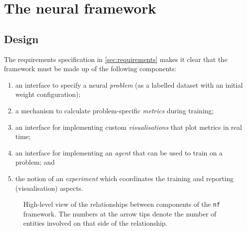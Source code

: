 \chapter{The neural framework}
\label{chap:framework}

\section{Design}
The requirements specification in \ref{sec:requirements} makes it clear that the framework must be made up of the following components:
\begin{enumerate}
    \item an interface to specify a neural \textit{problem} (as a labelled dataset with an initial weight configuration);
    \item a mechanism to calculate problem-specific \textit{metrics} during training;
    \item an interface for implementing custom \textit{visualisations} that plot metrics in real time;
    \item an interface for implementing an \textit{agent} that can be used to train on a problem; and
    \item the notion of an \textit{experiment} which coordinates the training and reporting (visualisation) aspects.
\end{enumerate}
\begin{figure}
    \centering
    \caption{High-level view of the relationships between components of the \texttt{nf} framework. The numbers at the arrow tips denote the number of entities involved on that side of the relationship.}
    \label{fig:nf_components}
\end{figure}
